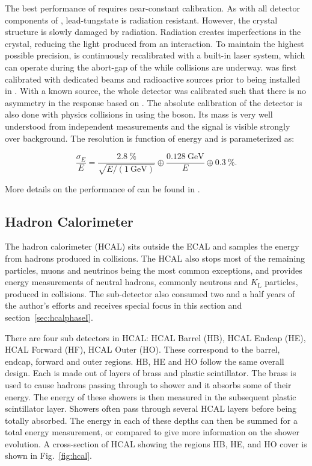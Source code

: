 The best performance of \ECAL requires near-constant calibration. As with all detector components of \CMS, lead-tungstate is radiation resistant. However, the crystal structure is slowly damaged by radiation. Radiation creates imperfections in the crystal, reducing the light produced from an interaction. To maintain the highest possible precision, \ECAL is continuously recalibrated with a built-in laser system, which can operate during the abort-gap of the \LHC while collisions are underway. \ECAL was first calibrated with dedicated beams and radioactive sources prior to being installed in \CMS.  With a known source, the whole detector was calibrated such that there is no asymmetry in the response based on \etaphi. The absolute calibration of the detector is also done with physics collisions in \CMS using the \Z boson. Its mass is very well understood from independent measurements and the signal is visible strongly over background.  The resolution is function of energy and is parameterized as:

\begin{equation}\label{eq:ecal}
    \frac{\sigma_{E}}{E}
    =   
    \frac{\SI{2.8}{\%}}{\sqrt{E/\left(\SI{1}{\GeV}\right)}}
    \oplus
    \frac{\SI{0.128}{\GeV}}{E}
    \oplus
    \SI{0.3}{\%}.
\end{equation}

More details on the performance of \ECAL can be found in \cite{ecalPerf}.

\subsection{Hadron Calorimeter}
\label{subsec:HCAL}

The hadron calorimeter (HCAL) sits outside the ECAL and samples the energy from hadrons produced in collisions.  The HCAL also stops most of the remaining particles, muons and neutrinos being the most common exceptions, and provides energy measurements of neutral hadrons, commonly neutrons and $K_{\mathrm{L}}$ particles, produced in collisions. The \HCAL sub-detector also consumed two and a half years of the author's efforts and receives special focus in this section and section~\ref{sec:hcalphaseI}.

There are four sub detectors in HCAL: HCAL Barrel (HB), HCAL Endcap (HE), HCAL Forward (HF), HCAL Outer (HO).  These correspond to the barrel, endcap, forward and outer regions.  HB, HE and HO follow the same overall design.  Each is made out of layers of brass and plastic scintillator.  The brass is used to cause hadrons passing through to shower and it absorbs some of their energy. The energy of these showers is then measured in the subsequent plastic scintillator layer. Showers often pass through several HCAL layers before being totally absorbed.  The energy in each of these depths can then be summed for a total energy measurement, or compared to give more information on the shower evolution. A cross-section of HCAL showing the regions HB, HE, and HO cover is shown in Fig.~\ref{fig:hcal}.

